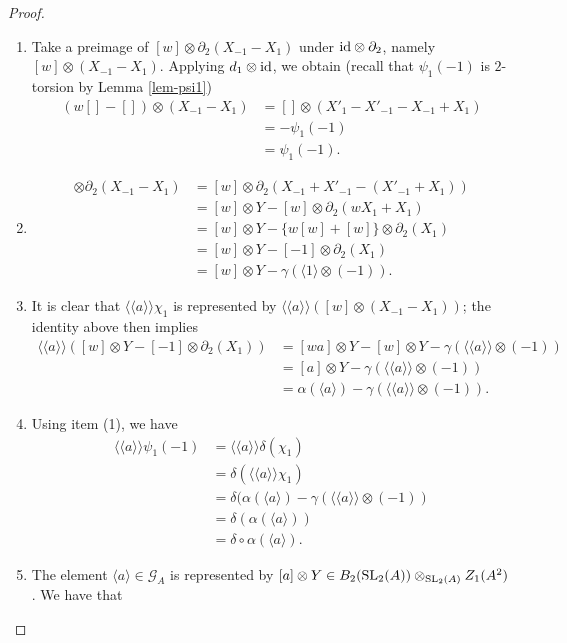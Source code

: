 \documentclass[11pt]{amsart}
\theoremstyle{definition}
\theoremstyle{plain}
\numberwithin{equation}{section}
\newcommand{\GG}{\mathcal{G}}
\newcommand{\lan}{\langle}
\newcommand{\ran}{\rangle}
\newcommand{\Lan}{\langle \! \langle}
\newcommand{\Ran}{\rangle \! \rangle}
\newcommand{\SL}{\mathit{{\rm SL}}}
\newcommand{\id}{{\rm id}}
\begin{document}
\begin{proof}
\begin{enumerate}
    \item Take a preimage of $[w]\otimes \partial_2(X_{-1}-X_1)$ under $\id\otimes\partial_2$, namely $[w]\otimes(X_{-1}-X_1)$. Applying $d_1\otimes\id$, we obtain (recall that $\psi_1(-1)$ is $2$-torsion by Lemma \ref{lem-psi1})
    \begin{align*}
        (w[]-[])\otimes(X_{-1}-X_1)&=[]\otimes(X'_1-X'_{-1}-X_{-1}+X_1)\\
        &=-\psi_1(-1)\\
        &=\psi_1(-1).
    \end{align*}
    \item 
    \begin{align*}
        [w]\otimes\partial_2(X_{-1}-X_1)&=[w]\otimes\partial_2(X_{-1}+X'_{-1}-(X'_{-1}+X_1))\\
        &=[w]\otimes Y-[w]\otimes\partial_2(wX_1+X_1)\\
        &=[w]\otimes Y-\{w[w]+[w]\}\otimes\partial_2(X_1)\\
        &=[w]\otimes Y-[-1]\otimes\partial_2(X_1)\\
        &=[w]\otimes Y-\gamma(\lan 1\ran\otimes(-1)).
    \end{align*}
    \item It is clear that $\Lan a\Ran\chi_1$ is represented by $\Lan a\Ran([w]\otimes(X_{-1}-X_1))$; the identity above then implies
    \begin{align*}
        \Lan a\Ran([w]\otimes Y-[-1]\otimes\partial_2(X_1))&=[wa]\otimes Y - [w]\otimes Y-\gamma(\Lan a\Ran\otimes (-1))\\
        &=[a]\otimes Y-\gamma(\Lan a\Ran\otimes (-1))\\
        &=\alpha(\lan a\ran)-\gamma(\Lan a\Ran\otimes (-1)).
    \end{align*}
    \item Using item (1), we have
    \begin{align*}
        \Lan a\Ran\psi_1(-1)&=\Lan a\Ran\delta(\chi_1)\\
        &=\delta(\Lan a\Ran\chi_1)\\
        &=\delta(\alpha(\lan a\ran)-\gamma(\Lan a\Ran\otimes(-1))\\
        &=\delta(\alpha(\lan a\ran))\\
        &=\delta\circ\alpha(\lan a\ran).
    \end{align*}
    \item The element $\lan a\ran\in\GG_A$ is represented by $[a]\otimes Y\in B_2(\SL_2(A))\otimes_{\SL_2(A)} Z_1(A^2)$. We have that

\end{enumerate}
\end{proof}
\end{document}
